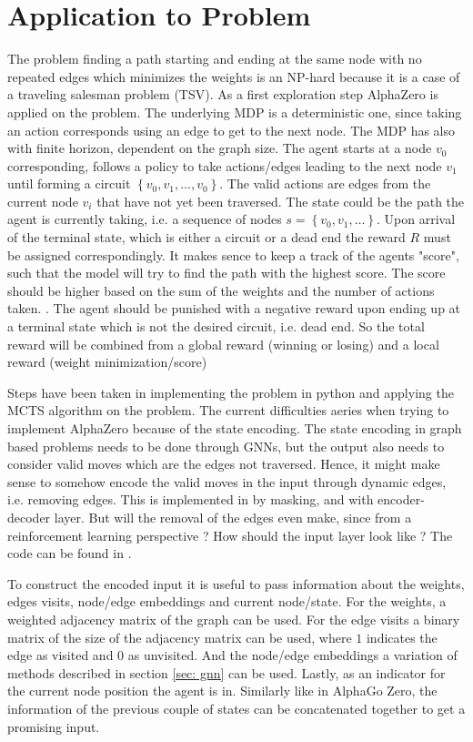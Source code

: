 \section{Application to Problem}
The problem finding a path starting and ending at the same node with no
repeated edges which minimizes the weights is an NP-hard because it is a case
of a traveling salesman problem (TSV). As a first exploration step AlphaZero
is applied on the problem. The underlying MDP is a deterministic one, since
taking an action corresponds using an edge to get to the next node. The MDP
has also with finite horizon, dependent on the graph size. The agent starts
at a node $v_0$ corresponding, follows a policy to take actions/edges leading
to the next node $v_1$ until forming a circuit $\left\{ v_0, v_1, \ldots, v_0
\right\}$. The valid actions are edges from the current node $v_i$ that have
not yet been traversed. The state could be the path the agent is currently
taking, i.e. a sequence of nodes $s = \left\{ v_0,v_1,\ldots \right\}$. Upon
arrival of the terminal state, which is either a circuit or a dead end the
reward $R$ must be assigned correspondingly. It makes sence to keep a track
of the agents "score", such that the model will try to find the path with the
highest score. The score should be higher based on the sum of the weights and
the number of actions taken. . The agent should be punished with a negative
reward upon ending up at a terminal state which is not the desired circuit,
i.e. dead end. So the total reward will be combined from a global reward
(winning or losing) and a local reward (weight minimization/score)
\newline

Steps have been taken in implementing the problem in python and applying the
MCTS algorithm on the problem. The current difficulties aeries when trying to
implement AlphaZero because of the state encoding. The state encoding in
graph based problems needs to be done through GNNs, but the output also needs
to consider valid moves which are the edges not traversed. Hence, it might
make sense to somehow encode the valid moves in the input through dynamic
edges, i.e. removing edges. This is implemented in \cite{rl_coopt} by
masking, and with encoder-decoder layer. But will the removal of the edges
even make, since from a reinforcement learning perspective ? How should the
input layer look like ? The code can be found in \cite{github}.
\newline

To construct the encoded input it is useful to pass information about the
weights, edges visits, node/edge embeddings and current node/state. For the
weights, a weighted adjacency matrix of the graph can be used. For the edge
visits a binary matrix of the size of the adjacency matrix can be used, where
$1$ indicates the edge as visited and $0$ as unvisited. And the node/edge
embeddings a variation of methods described in section \ref{sec: gnn} can be
used. Lastly, as an indicator for the current node position the agent is in.
Similarly like in AlphaGo Zero, the information of the previous couple of
states can be concatenated together to get a promising input.


\nocite{alphazero}
\nocite{mcts_chess}
\nocite{ml_foundations}
\nocite{mcts}
\nocite{gan_velickovic}
\nocite{gnn_overview}
\nocite{wsgat}
\nocite{rl_coopt}
\nocite{routing_opt_rl_sl}
\nocite{mcts_survey}
\printbibliography



